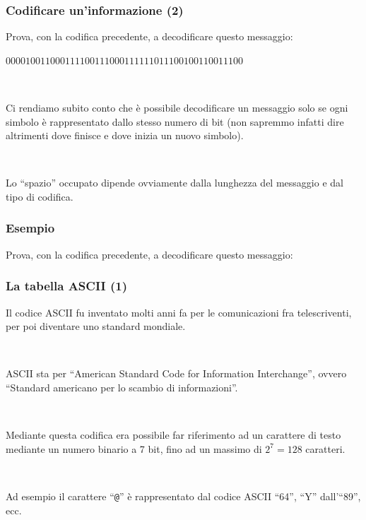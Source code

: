 \documentclass[handout]{beamer}
\begin{document}
\begin{frame}
\frametitle{Codificare un'informazione (2)}
Prova, con la codifica precedente, a \alert<1-2>{decodificare} questo messaggio:
\begin{center}
  $ 0000 1001 1000 1111 0011 1000 1111 1101 1100 1001 1001 1100 $
\end{center}

~

Ci rendiamo subito conto che è possibile decodificare un messaggio solo se ogni simbolo è \alert{rappresentato dallo stesso numero di bit} (non sapremmo infatti dire altrimenti dove finisce e dove inizia un nuovo simbolo).\pause

~

Lo ``spazio'' occupato dipende ovviamente dalla lunghezza del messaggio e dal tipo di codifica.
\end{frame}


\begin{frame}
\frametitle{Esempio}
Prova, con la codifica precedente, a \alert{decodificare} questo messaggio:
\begin{center}
  
\end{center}
\end{frame}


\begin{frame}
\frametitle{La tabella ASCII (1)}
Il codice ASCII fu inventato molti anni fa per le comunicazioni fra telescriventi, per poi diventare uno \alert<1>{standard mondiale}.\pause

~

ASCII sta per ``American Standard Code for Information Interchange'', ovvero ``Standard americano per lo scambio di informazioni''.\pause

~

Mediante questa codifica era possibile far riferimento ad un carattere di testo mediante un numero binario a 7 bit, fino ad un massimo di $2^7 = 128 $ caratteri.

~

Ad esempio il carattere ``\texttt{@}'' è rappresentato dal codice ASCII ``64'', ``Y'' dall'``89'', ecc.
\end{frame}
\end{document}

